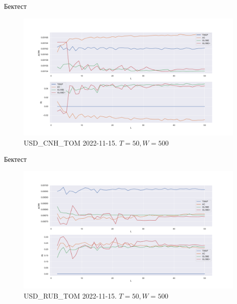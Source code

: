 \documentclass[aspectratio=169]{beamer}
\begin{document}
        \begin{frame}{Бектест}
        
            \begin{figure}  
                \centering
                \includegraphics[width=0.83\linewidth]{USD_CNH_T+1 2022-11-15 T = 50 W = 500}
                \caption{USD\_CNH\_TOM 2022-11-15. $T = 50, W = 500$}
            \end{figure}

        \end{frame}

        \begin{frame}{Бектест}
        
            \begin{figure}  
                \centering
                \includegraphics[width=0.83\linewidth]{USD_RUB_T+1 2022-10-20 T = 50 W = 500}
                \caption{USD\_RUB\_TOM 2022-11-15. $T = 50, W = 500$}
            \end{figure}

        \end{frame}
\end{document}
